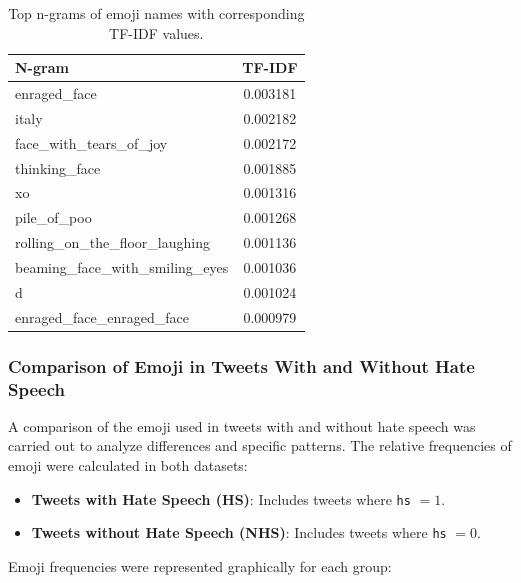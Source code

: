 \begin{table}[!h]
    \centering
    \begin{tabular}{lc}
    \toprule
    \textbf{N-gram} & \textbf{TF-IDF} \\
    \midrule
    enraged\_face & 0.003181 \\
    italy & 0.002182 \\
    face\_with\_tears\_of\_joy & 0.002172 \\
    thinking\_face & 0.001885 \\
    xo & 0.001316 \\
    pile\_of\_poo & 0.001268 \\
    rolling\_on\_the\_floor\_laughing & 0.001136 \\
    beaming\_face\_with\_smiling\_eyes & 0.001036 \\
    d & 0.001024 \\
    enraged\_face\_enraged\_face & 0.000979 \\
    \bottomrule
    \end{tabular}
    \caption{Top n-grams of emoji names with corresponding TF-IDF values.}
    \label{tab:tfidf_results}
\end{table}

\subsubsection{Comparison of Emoji in Tweets With and Without Hate Speech}
A comparison of the emoji used in tweets with and without hate speech was carried out to analyze differences and specific patterns. The relative frequencies of emoji were calculated in both datasets:
\begin{itemize}
    \item \textbf{Tweets with Hate Speech (HS)}: Includes tweets where \texttt{hs} $= 1$.
    \item \textbf{Tweets without Hate Speech (NHS)}: Includes tweets where \texttt{hs} $= 0$.
\end{itemize}
Emoji frequencies were represented graphically for each group:

